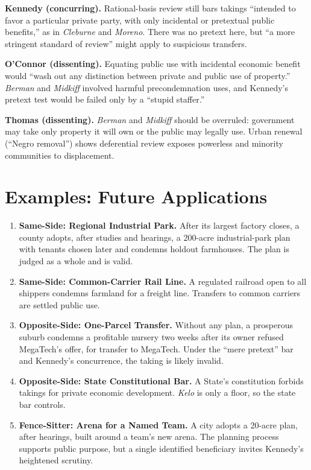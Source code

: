 \documentclass[12pt]{article}
\begin{document}
\textbf{Kennedy (concurring).} Rational-basis review still bars takings ``intended to favor a particular private party, with only incidental or pretextual public benefits,'' as in \textit{Cleburne} and \textit{Moreno}. There was no pretext here, but ``a more stringent standard of review'' might apply to suspicious transfers.

\textbf{O'Connor (dissenting).} Equating public use with incidental economic benefit would ``wash out any distinction between private and public use of property.'' \textit{Berman} and \textit{Midkiff} involved harmful precondemnation uses, and Kennedy's pretext test would be failed only by a ``stupid staffer.''

\textbf{Thomas (dissenting).} \textit{Berman} and \textit{Midkiff} should be overruled: government may take only property it will own or the public may legally use. Urban renewal (``Negro removal'') shows deferential review exposes powerless and minority communities to displacement.

\section{Examples: Future Applications}

\begin{enumerate}
\item \textbf{Same-Side: Regional Industrial Park.} After its largest factory closes, a county adopts, after studies and hearings, a 200-acre industrial-park plan with tenants chosen later and condemns holdout farmhouses. The plan is judged as a whole and is valid.
\item \textbf{Same-Side: Common-Carrier Rail Line.} A regulated railroad open to all shippers condemns farmland for a freight line. Transfers to common carriers are settled public use.
\item \textbf{Opposite-Side: One-Parcel Transfer.} Without any plan, a prosperous suburb condemns a profitable nursery two weeks after its owner refused MegaTech's offer, for transfer to MegaTech. Under the ``mere pretext'' bar and Kennedy's concurrence, the taking is likely invalid.
\item \textbf{Opposite-Side: State Constitutional Bar.} A State's constitution forbids takings for private economic development. \textit{Kelo} is only a floor, so the state bar controls.
\item \textbf{Fence-Sitter: Arena for a Named Team.} A city adopts a 20-acre plan, after hearings, built around a team's new arena. The planning process supports public purpose, but a single identified beneficiary invites Kennedy's heightened scrutiny.
\end{enumerate}
\end{document}
